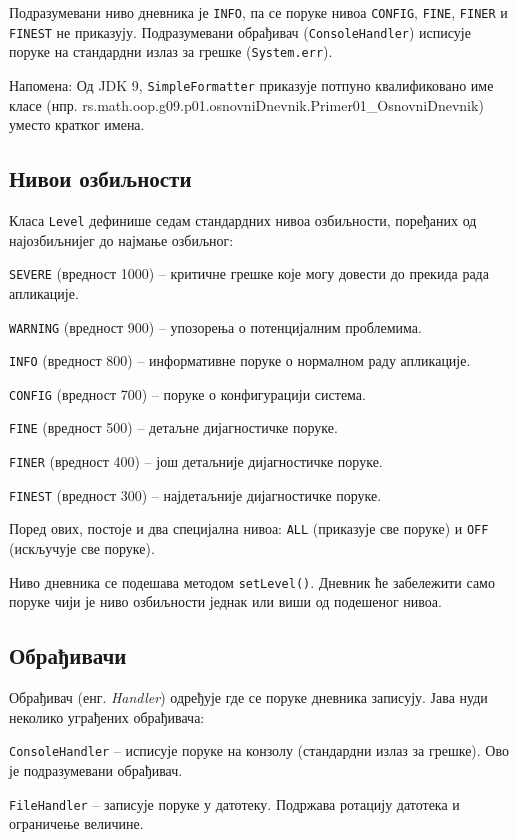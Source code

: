 Подразумевани ниво дневника је \texttt{INFO}, па се поруке нивоа \texttt{CONFIG}, \texttt{FINE}, \texttt{FINER} и \texttt{FINEST} не приказују. Подразумевани обрађивач (\texttt{ConsoleHandler}) исписује поруке на стандардни излаз за грешке (\texttt{System.err}).

Напомена: Од JDK 9, \texttt{SimpleFormatter} приказује потпуно квалификовано име класе (нпр. rs.math.oop.g09.p01.osnovniDnevnik.Primer01\_OsnovniDnevnik) уместо кратког имена.


\subsection{Нивои озбиљности}

Класа \texttt{Level} дефинише седам стандардних нивоа озбиљности, поређаних од најозбиљнијег до најмање озбиљног:

\texttt{SEVERE} (вредност 1000) – критичне грешке које могу довести до прекида рада апликације.

\texttt{WARNING} (вредност 900) – упозорења о потенцијалним проблемима.

\texttt{INFO} (вредност 800) – информативне поруке о нормалном раду апликације.

\texttt{CONFIG} (вредност 700) – поруке о конфигурацији система.

\texttt{FINE} (вредност 500) – детаљне дијагностичке поруке.

\texttt{FINER} (вредност 400) – још детаљније дијагностичке поруке.

\texttt{FINEST} (вредност 300) – најдетаљније дијагностичке поруке.

Поред ових, постоје и два специјална нивоа: \texttt{ALL} (приказује све поруке) и \texttt{OFF} (искључује све поруке).

Ниво дневника се подешава методом \texttt{setLevel()}. Дневник ће забележити само поруке чији је ниво озбиљности једнак или виши од подешеног нивоа.


\subsection{Обрађивачи}

Обрађивач (енг. \textit{Handler}) одређује где се поруке дневника записују. Јава нуди неколико уграђених обрађивача:

\texttt{ConsoleHandler} – исписује поруке на конзолу (стандардни излаз за грешке). Ово је подразумевани обрађивач.

\texttt{FileHandler} – записује поруке у датотеку. Подржава ротацију датотека и ограничење величине.

